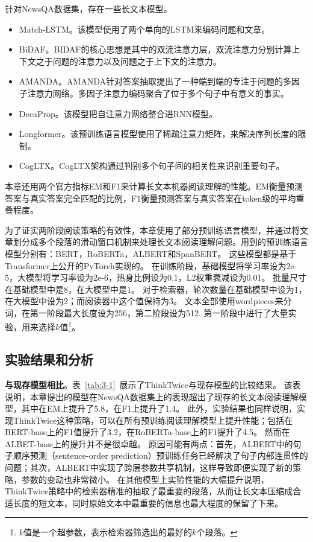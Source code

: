 针对NewsQA数据集，存在一些长文本模型。
\begin{itemize}
    \item Match-LSTM\cite{wang2015learning}。该模型使用了两个单向的LSTM来编码问题和文章。
    \item BiDAF\cite{seo2016bidirectional}。BIDAF的核心思想是其中的双流注意力层，双流注意力分别计算上下文之于问题的注意力以及问题之于上下文的注意力。
    \item AMANDA\cite{kundu2018question}。AMANDA针对答案抽取提出了一种端到端的专注于问题的多因子注意力网络。多因子注意力编码聚合了位于多个句子中有意义的事实。
    \item DecaProp\cite{tay2018densely}。该模型把自注意力网络整合进RNN模\cite{mikolov2010recurrent}型。
    \item Longformer\cite{beltagy2020longformer}。该预训练语言模型使用了稀疏注意力矩阵，来解决序列长度的限制。
    \item CogLTX\cite{ding2020cogltx}。CogLTX架构通过判别多个句子间的相关性来识别重要句子。
\end{itemize}

本章还用两个官方指标EM和F1来计算长文本机器阅读理解的性能。EM衡量预测答案与真实答案完全匹配的比例，F1衡量预测答案与真实答案在token级的平均重叠程度。

为了证实两阶段阅读策略的有效性，本章使用了部分预训练语言模型，并通过将文章划分成多个段落的滑动窗口机制来处理长文本阅读理解问题。用到的预训练语言模型分别有：BERT\cite{devlin2018bert}，RoBERTa\cite{liu2019roberta}，ALBERT\cite{lan2019albert}和SpanBERT\cite{joshi2020spanbert}。
这些模型都是基于Transformer\cite{vaswani2017attention}上公开的PyTorch实现的。
在训练阶段，基础模型将学习率设为2e-5，大模型将学习率设为2e-6，热身比例设为0.1，L2权重衰减设为0.01。
批量尺寸在基础模型中是8，在大模型中是1。
对于检索器，轮次数量在基础模型中设为1，在大模型中设为2；而阅读器中这个值保持为3。
文本全部使用wordpieces\cite{wu2016google}来分词，在第一阶段最大长度设为256，第二阶段设为512.
第一阶段中进行了大量实验，用来选择$k$值\footnote{$k$值是一个超参数，表示检索器筛选出的最好的$k$个段落。}。



\subsection{实验结果和分析}
\textbf{与现存模型相比}。表~\ref{tab:3-1}~展示了ThinkTwice与现存模型的比较结果。
该表说明，本章提出的模型在NewsQA数据集上的表现超出了现存的长文本阅读理解模型，其中在EM上提升了5.8，在F1上提升了1.4。
此外，实验结果也同样说明，实现ThinkTwice这种策略，可以在所有预训练阅读理解模型上提升性能；包括在BERT-base上的F1值提升了3.2，在RoBERTa-base上的F1提升了4.5。
然而在ALBET-base上的提升并不是很卓越。
原因可能有两点：首先，ALBERT中的句子顺序预测（sentence-order prediction）预训练任务已经解决了句子内部连贯性的问题；其次，ALBERT中实现了跨层参数共享机制，这样导致即便实现了新的策略，参数的变动也非常微小。
在其他模型上实验性能的大幅提升说明，ThinkTwice策略中的检索器精准的抽取了最重要的段落，从而让长文本压缩成合适长度的短文本，同时原始文本中最重要的信息也最大程度的保留了下来。

